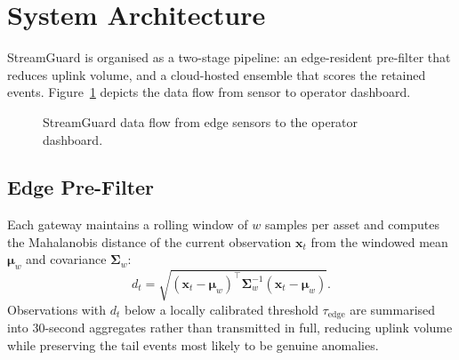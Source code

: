 \section{System Architecture}
StreamGuard is organised as a two-stage pipeline: an edge-resident pre-filter that reduces
uplink volume, and a cloud-hosted ensemble that scores the retained events. Figure~\ref{fig:architecture}
depicts the data flow from sensor to operator dashboard.

\begin{figure}[htbp]
\centering
{}
\caption{StreamGuard data flow from edge sensors to the operator dashboard.}
\label{fig:architecture}
\end{figure}

\subsection{Edge Pre-Filter}
Each gateway maintains a rolling window of $w$ samples per asset and computes the Mahalanobis
distance of the current observation $\mathbf{x}_t$ from the windowed mean $\boldsymbol{\mu}_w$
and covariance $\boldsymbol{\Sigma}_w$:
\begin{equation}
d_t = \sqrt{(\mathbf{x}_t - \boldsymbol{\mu}_w)^\top \boldsymbol{\Sigma}_w^{-1} (\mathbf{x}_t - \boldsymbol{\mu}_w)}.
\label{eq:mahalanobis}
\end{equation}
Observations with $d_t$ below a locally calibrated threshold $\tau_{\text{edge}}$ are
summarised into 30-second aggregates rather than transmitted in full, reducing uplink volume
while preserving the tail events most likely to be genuine anomalies.

